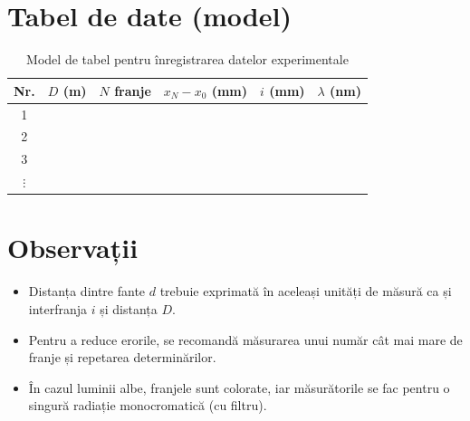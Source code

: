 \documentclass[12pt,a4paper]{article}
\begin{document}
\section{Tabel de date (model)}
\begin{table}[h!]
\centering
\caption{Model de tabel pentru înregistrarea datelor experimentale}
\begin{tabular}{@{}cccccc@{}}
\toprule
Nr. & \(D\) (m) & \(N\) franje & \(x_N - x_0\) (mm) & \(i\) (mm) & \(\lambda\) (nm) \\
\midrule
1 & & & & & \\
2 & & & & & \\
3 & & & & & \\
\(\vdots\) & & & & & \\
\bottomrule
\end{tabular}
\end{table}

\section*{Observații}
\begin{itemize}
    \item Distanța dintre fante \(d\) trebuie exprimată în aceleași unități de măsură ca și interfranja \(i\) și distanța \(D\).
    \item Pentru a reduce erorile, se recomandă măsurarea unui număr cât mai mare de franje și repetarea determinărilor.
    \item În cazul luminii albe, franjele sunt colorate, iar măsurătorile se fac pentru o singură radiație monocromatică (cu filtru).
\end{itemize}
\end{document}
